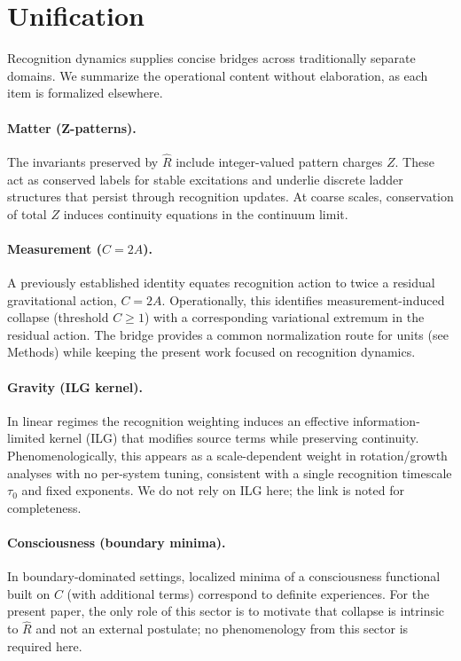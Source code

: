 \documentclass[aps,prx,twocolumn,superscriptaddress,nofootinbib]{revtex4-2}
\newcommand{\Rhat}{\hat{R}}
\newcommand{\Ccost}{C}
\newcommand{\TauZero}{\tau_{0}}
\begin{document}
\section{Unification}\label{sec:unification}
Recognition dynamics supplies concise bridges across traditionally separate domains. We summarize the operational content without elaboration, as each item is formalized elsewhere.

\paragraph*{Matter (Z-patterns).} The invariants preserved by \(\Rhat\) include integer-valued pattern charges \(Z\). These act as conserved labels for stable excitations and underlie discrete ladder structures that persist through recognition updates. At coarse scales, conservation of total \(Z\) induces continuity equations in the continuum limit.

\paragraph*{Measurement (\(\Ccost=2A\)).} A previously established identity equates recognition action to twice a residual gravitational action, \(\Ccost=2A\). Operationally, this identifies measurement-induced collapse (threshold \(\Ccost\ge 1\)) with a corresponding variational extremum in the residual action. The bridge provides a common normalization route for units (see Methods) while keeping the present work focused on recognition dynamics.

\paragraph*{Gravity (ILG kernel).} In linear regimes the recognition weighting induces an effective information-limited kernel (ILG) that modifies source terms while preserving continuity. Phenomenologically, this appears as a scale-dependent weight in rotation/growth analyses with no per-system tuning, consistent with a single recognition timescale \(\TauZero\) and fixed exponents. We do not rely on ILG here; the link is noted for completeness.

\paragraph*{Consciousness (boundary minima).} In boundary-dominated settings, localized minima of a consciousness functional built on \(\Ccost\) (with additional terms) correspond to definite experiences. For the present paper, the only role of this sector is to motivate that collapse is intrinsic to \(\Rhat\) and not an external postulate; no phenomenology from this sector is required here.
\end{document}
